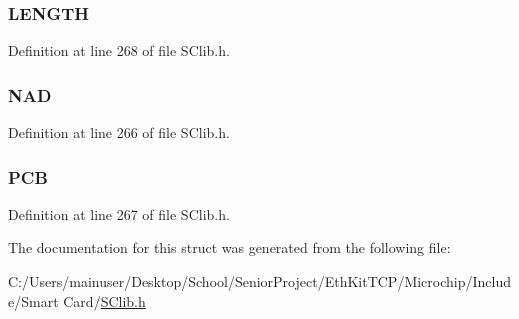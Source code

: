 \subsubsection[{L\+E\+N\+G\+T\+H}]{ L\+E\+N\+G\+T\+H}\label{struct_s_c___t1___p_r_o_l_o_g_u_e___f_i_e_l_d_abf22f15f6378ae410118b8707989cdeb}


Definition at line 268 of file S\+Clib.\+h.

\hypertarget{struct_s_c___t1___p_r_o_l_o_g_u_e___f_i_e_l_d_a455e056e4d36a98838cbb0044f30c56f}{}
\subsubsection[{N\+A\+D}]{ N\+A\+D}\label{struct_s_c___t1___p_r_o_l_o_g_u_e___f_i_e_l_d_a455e056e4d36a98838cbb0044f30c56f}


Definition at line 266 of file S\+Clib.\+h.

\hypertarget{struct_s_c___t1___p_r_o_l_o_g_u_e___f_i_e_l_d_abfc828b1412864bc4558c81fb72adfd0}{}
\subsubsection[{P\+C\+B}]{ P\+C\+B}\label{struct_s_c___t1___p_r_o_l_o_g_u_e___f_i_e_l_d_abfc828b1412864bc4558c81fb72adfd0}


Definition at line 267 of file S\+Clib.\+h.



The documentation for this struct was generated from the following file\+:\begin{DoxyCompactItemize}
\item 
C\+:/\+Users/mainuser/\+Desktop/\+School/\+Senior\+Project/\+Eth\+Kit\+T\+C\+P/\+Microchip/\+Include/\+Smart Card/\hyperlink{_s_clib_8h}{S\+Clib.\+h}\end{DoxyCompactItemize}
